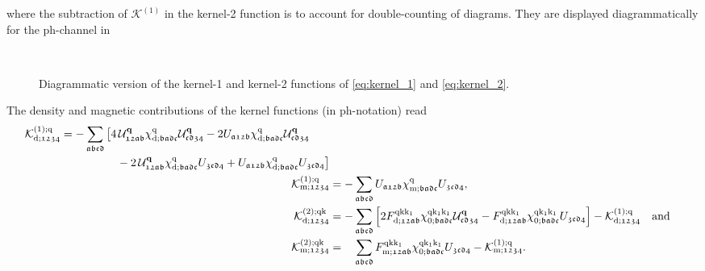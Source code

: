 \documentclass[../../main.tex]{subfiles}
\begin{document}
where the subtraction of $\mathcal{K}^{(1)}$ in the kernel-2 function is to account for double-counting of diagrams. They are displayed diagrammatically for the ph-channel in 
\begin{figure}[h]
  \centering
  \subfloat{}\vspace{0.5cm}\\
  \subfloat{}
  \caption{Diagrammatic version of the kernel-1 and kernel-2 functions of \eqref{eq:kernel_1} and \eqref{eq:kernel_2}.}
  \label{fig:kernel_functions}
\end{figure}
The density and magnetic contributions of the kernel functions (in ph-notation) read
\begin{subequations}
\begin{align}
\begin{split}
	\mathcal{K}^{(1);\text{q}}_{\text{d};\mathfrak{1234}}&=-\sum_{\mathfrak{abcd}}\big [4\,\mathcal{U}^{\textbf{q}}_{\mathfrak{12ab}} \chi^{\text{q}}_{\text{d};\mathfrak{badc}} \mathcal{U}^{\textbf{q}}_{\mathfrak{cd34}} - 2 U_{\mathfrak{a12b}} \chi^{\text{q}}_{\text{d};\mathfrak{badc}} \mathcal{U}^{\textbf{q}}_{\mathfrak{cd34}} \\
	&\qquad\qquad\quad - 2 \,\mathcal{U}^{\textbf{q}}_{\mathfrak{12ab}} \chi^{\text{q}}_{\text{d};\mathfrak{badc}} U_{\mathfrak{3cd4}} + U_{\mathfrak{a12b}} \chi^{\text{q}}_{\text{d};\mathfrak{badc}} U_{\mathfrak{3cd4}}\big ]
\end{split}\\
	\mathcal{K}^{(1);\text{q}}_{\text{m};\mathfrak{1234}}&=-\sum_{\mathfrak{abcd}} U_{\mathfrak{a12b}} \chi^{\text{q}}_{\text{m};\mathfrak{badc}} U_{\mathfrak{3cd4}},\\
	\mathcal{K}^{(2);\text{q}\text{k}}_{\text{d};\mathfrak{1234}}&=- \sum_{\mathfrak{abcd}} \left [2 F^{\text{q}\text{k}\text{k}_1}_{\text{d};\mathfrak{12ab}} \chi^{\text{q}\text{k}_1\text{k}_1}_{0;\mathfrak{badc}} \mathcal{U}^{\textbf{q}}_{\mathfrak{cd34}}  - F^{\text{q}\text{k}\text{k}_1}_{\text{d};\mathfrak{12ab}} \chi^{\text{q}\text{k}_1\text{k}_1}_{0;\mathfrak{badc}} U_{\mathfrak{3cd4}}\right ] - \mathcal{K}^{(1);\text{q}}_{\text{d};\mathfrak{1234}}\quad\text{and}\\
	\mathcal{K}^{(2);\text{q}\text{k}}_{\text{m};\mathfrak{1234}}&=\phantom{-}\sum_{\mathfrak{abcd}} F^{\text{q}\text{k}\text{k}_1}_{\text{m};\mathfrak{12ab}} \chi^{\text{q}\text{k}_1\text{k}_1}_{0;\mathfrak{badc}} U_{\mathfrak{3cd4}} - \mathcal{K}^{(1);\text{q}}_{\text{m};\mathfrak{1234}}.
\end{align}
\end{subequations}
\end{document}
